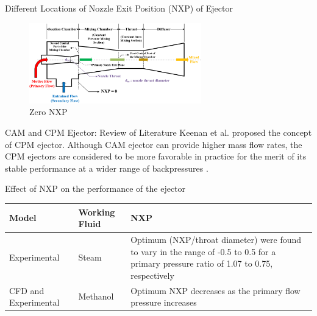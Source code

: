 \begin{frame}{Different Locations of Nozzle Exit Position (NXP) of Ejector\cite{eames1999experimental,eames2007results,kumar2019effect,wang2017numerical, ramesh2018experimental, meyer2009steam}}
    \begin{figure}
        \centering
        \includegraphics[height=3.5cm]{images/NXP0.PNG}
        \caption{\centering Zero NXP}
        \label{fig:nxpnxpzero}
    \end{figure}
\end{frame}

\begin{frame}{CAM and CPM Ejector: Review of Literature}
    Keenan et al. \cite{keenan1950investigation} proposed the concept of CPM ejector. Although CAM ejector can provide higher mass flow rates, the CPM ejectors are considered to be more favorable in practice for the merit of its stable performance at a wider range of backpressures \cite{tashtoush2019comprehensive}.
\end{frame}

\begin{frame}{Effect of NXP on the performance of the ejector\cite{tashtoush2019comprehensive}}
    \begin{table}[h]
        \centering
        \begin{tabular}{|p{2cm}|p{1.5cm}|p{4.5cm}|}
        \hline
            Model & Working Fluid & NXP\\
        \hline
             Experimental\cite{eames1999experimental} & Steam & Optimum (NXP/throat diameter) were found to vary in the range of -0.5 to 0.5 for a primary pressure ratio of 1.07 to 0.75, respectively \\
        \hline
             CFD and Experimental\cite{wang2018auto} & Methanol & Optimum NXP decreases as the primary flow pressure increases \\
        \hline
        \end{tabular}
    \end{table}
\end{frame}

